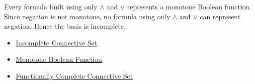 \begin{remark*}[Interpretation]
Every formula built using only \(\land\) and \(\lor\) represents a monotone
Boolean function. Since negation is not monotone, no formula using only
\(\land\) and \(\lor\) can represent negation. Hence the basis is incomplete.
\end{remark*}

\begin{dependencies}
\begin{itemize}
  \item \hyperref[def:incomplete-connective-set-propositional-logic]{Incomplete Connective Set}
  \item \hyperref[def:monotone-boolean-function-propositional-logic]{Monotone Boolean Function}
  \item \hyperref[def:functionally-complete-connective-set-propositional-logic]{Functionally Complete Connective Set}
\end{itemize}
\end{dependencies}
